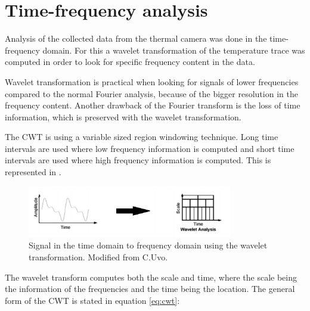 \section{Time-frequency analysis}

Analysis of the collected data from the thermal camera was done in the time-frequency domain. For this a wavelet transformation of the temperature trace was computed in order to look for specific frequency content in the data. 

Wavelet transformation is practical when looking for signals of lower frequencies compared to the normal Fourier analysis, because of the bigger resolution in the frequency content. Another drawback of the Fourier transform is the loss of time information, which is preserved with the wavelet transformation. \cite{geyer2004}


The CWT is using a variable sized region windowing technique. Long time intervals are used where low frequency information is computed and short time intervals are used where high frequency information is computed. This is represented in .

\begin{figure}[H]
	\centering	\includegraphics[width=0.8\textwidth]{figures/signalToWavelet}
	\caption{Signal in the time domain to frequency domain using the wavelet transformation. Modified from C.Uvo.\cite{Uvo1995}}
	\label{fig:sigToWave}
\end{figure} \vspace{-.3cm}

The wavelet transform computes both the scale and time, where the scale being the information of the frequencies and the time being the location. The general form of the CWT is stated in equation \ref{eq:cwt}: 

